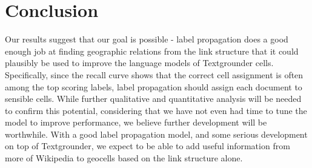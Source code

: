 \section{Conclusion}
Our results suggest that our goal is possible - label propagation does a good 
enough job at finding geographic relations from the link structure that it
could plausibly be used to improve the language models of Textgrounder cells.  
Specifically, since the recall curve shows that the correct cell assignment is 
often among the top scoring labels, label propagation should assign each 
document to sensible cells. While further qualitative and quantitative analysis 
will be needed to confirm this potential, considering that we have not even had 
time to tune the model to improve performance, we believe further development 
will be worthwhile. With a good label propagation model, and some serious 
development on top of Textgrounder, we expect to be able to add useful 
information from more of Wikipedia to geocells based on the link structure 
alone.
